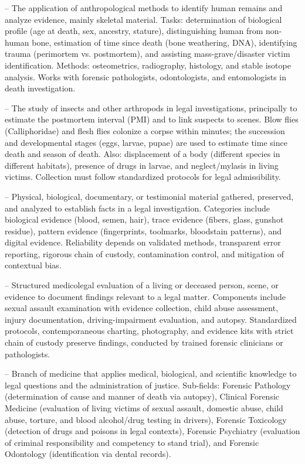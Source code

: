-- The application of anthropological methods to identify human remains and analyze evidence, mainly skeletal material. Tasks: determination of biological profile (age at death, sex, ancestry, stature), distinguishing human from non-human bone, estimation of time since death (bone weathering, DNA), identifying trauma (perimortem vs. postmortem), and assisting mass-grave/disaster victim identification. Methods: osteometrics, radiography, histology, and stable isotope analysis. Works with forensic pathologists, odontologists, and entomologists in death investigation.

-- The study of insects and other arthropods in legal investigations, principally to estimate the postmortem interval (PMI) and to link suspects to scenes. Blow flies (Calliphoridae) and flesh flies colonize a corpse within minutes; the succession and developmental stages (eggs, larvae, pupae) are used to estimate time since death and season of death. Also: displacement of a body (different species in different habitats), presence of drugs in larvae, and neglect/mylasis in living victims. Collection must follow standardized protocols for legal admissibility.

-- Physical, biological, documentary, or testimonial material gathered, preserved, and analyzed to establish facts in a legal investigation. Categories include biological evidence (blood, semen, hair), trace evidence (fibers, glass, gunshot residue), pattern evidence (fingerprints, toolmarks, bloodstain patterns), and digital evidence. Reliability depends on validated methods, transparent error reporting, rigorous chain of custody, contamination control, and mitigation of contextual bias.


-- Structured medicolegal evaluation of a living or deceased person, scene, or evidence to document findings relevant to a legal matter. Components include sexual assault examination with evidence collection, child abuse assessment, injury documentation, driving-impairment evaluation, and autopsy. Standardized protocols, contemporaneous charting, photography, and evidence kits with strict chain of custody preserve findings, conducted by trained forensic clinicians or pathologists.

-- Branch of medicine that applies medical, biological, and scientific knowledge to legal questions and the administration of justice. Sub-fields: Forensic Pathology (determination of cause and manner of death via autopsy), Clinical Forensic Medicine (evaluation of living victims of sexual assault, domestic abuse, child abuse, torture, and blood alcohol/drug testing in drivers), Forensic Toxicology (detection of drugs and poisons in legal contexts), Forensic Psychiatry (evaluation of criminal responsibility and competency to stand trial), and Forensic Odontology (identification via dental records).

